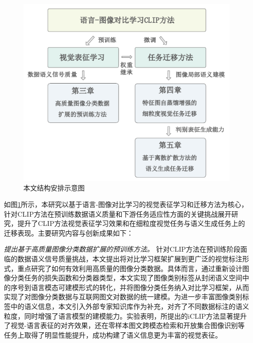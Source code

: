 \begin{figure}
  \centering
  \includegraphics[width=0.9\linewidth]{figures/论文-结构安排-v2.pdf}
  \caption{本文结构安排示意图}
  \label{fig:7-thesis-structure}
\end{figure}

如图\ref{fig:7-thesis-structure}所示，本研究以基于语言-图像对比学习的视觉表征学习和迁移方法为核心，针对CLIP方法在预训练数据语义质量和下游任务适应性方面的关键挑战展开研究，提升了CLIP方法视觉表征学习效果和在细粒度视觉任务与语义生成任务上的迁移表现。主要研究内容与创新成果如下：

\textit{提出基于高质量图像分类数据扩展的预训练方法。}
针对CLIP方法在预训练阶段面临的数据语义信号质量挑战，本文提出将对比学习框架扩展到更广泛的视觉标注形式，重点研究了如何有效利用高质量的图像分类数据。具体而言，通过重新设计图像分类任务的损失函数和分类器类型，本文实现了图像类别标签从封闭语义空间中的序号到语言模态可建模形式的转化，并将图像分类任务纳入对比学习框架，从而实现了对图像分类数据与互联网图文对数据的统一建模。为进一步丰富图像类别标签中的语义信息，本文引入外部专家知识库作为补充，对齐了不同数据标注的语义粒度，同时增强了语言模型的建模能力。实验表明，所提出的iCLIP方法显著提升了视觉-语言表征的对齐效果，还在零样本图文跨模态检索和开放集合图像识别等任务上取得了明显性能提升，成功构建了语义信息更为丰富的视觉表征。

